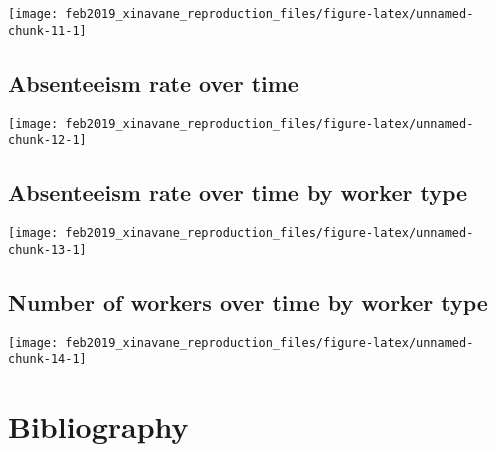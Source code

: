 \documentclass[]{article}
\begin{document}
\begin{center}\texttt{[image: feb2019\_xinavane\_reproduction\_files/figure-latex/unnamed-chunk-11-1]} \end{center}

\subsection{Absenteeism rate over
time}\label{absenteeism-rate-over-time}

\begin{center}\texttt{[image: feb2019\_xinavane\_reproduction\_files/figure-latex/unnamed-chunk-12-1]} \end{center}

\subsection{Absenteeism rate over time by worker
type}\label{absenteeism-rate-over-time-by-worker-type}

\begin{center}\texttt{[image: feb2019\_xinavane\_reproduction\_files/figure-latex/unnamed-chunk-13-1]} \end{center}

\subsection{Number of workers over time by worker
type}\label{number-of-workers-over-time-by-worker-type}

\begin{center}\texttt{[image: feb2019\_xinavane\_reproduction\_files/figure-latex/unnamed-chunk-14-1]} \end{center}

\section{Bibliography}\label{bibliography}
\end{document}
